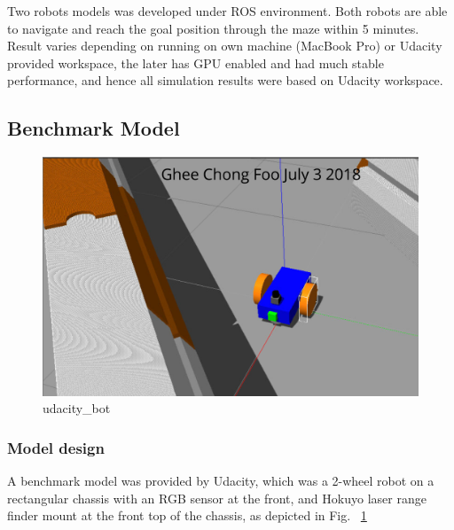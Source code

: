 \documentclass[10pt,journal,compsoc]{IEEEtran}
\begin{document}
Two robots models was developed under ROS environment.  Both robots are able to navigate and reach the goal position through the maze within 5 minutes.  Result varies depending on running on own machine (MacBook Pro) or Udacity provided workspace, the later has GPU enabled and had much stable performance, and hence all simulation results were based on Udacity workspace.


\subsection{Benchmark Model}

\begin{figure}[thpb]
      \centering
      \includegraphics[width=\linewidth]{udacity_bot}
      \caption{udacity\_bot}
      \label{fig:udacity_bot}
\end{figure}

\subsubsection{Model design}
A benchmark model was provided by Udacity, which was a 2-wheel robot on a rectangular chassis with an RGB sensor at the front, and Hokuyo laser range finder mount at the front top of the chassis, as depicted in Fig. ~\ref{fig:udacity_bot}
\end{document}
